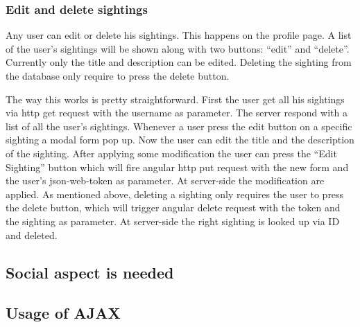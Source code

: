\documentclass{article}
\begin{document}
\subsubsection{Edit and delete sightings}
Any user can edit or delete his sightings. This happens on the profile page. A list of the user’s sightings will be shown along with two buttons: “edit” and “delete”. Currently only the title and description can be edited. Deleting the sighting from the database only require to press the delete button.

The way this works is pretty straightforward. 
First the user get all his sightings via http get request with the username as parameter. The server respond with a list of all the user’s sightings. 
Whenever a user press the edit button on a specific sighting a modal form pop up. Now the user can edit the title and the description of the sighting. After applying some modification the user can press the “Edit Sighting” button which will fire angular http put request with the new form and the user’s json-web-token as parameter. At server-side the modification are applied.
As mentioned above, deleting a sighting only requires the user to press the delete button, which will trigger angular delete request with the token and the sighting as parameter. At server-side the right sighting is looked up via ID and deleted.



\subsection{Social aspect is needed}

\subsection{Usage of AJAX}
\end{document}
